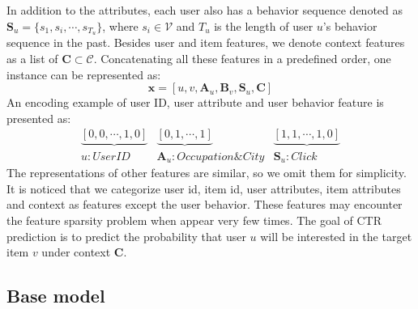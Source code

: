 In addition to the attributes, each user also has a behavior sequence denoted as $\textbf{S}_u = \{s_1,s_i,\cdots,s_{T_u}\}$, where $s_i \in \mathcal{V}$ and $T_u$ is the length of user $u$'s behavior sequence in the past.
Besides user and item features, we denote context features as a list of $\mathbf{C} \subset \mathcal{C}$.
Concatenating all these features in a predefined order, one instance can be represented as: 
\begin{equation}
\textbf{x}= [u, v, \textbf{A}_u, \textbf{B}_v, \textbf{S}_u, \textbf{C}]
\end{equation}
An encoding example of user ID, user attribute and user behavior feature is presented as:
$$
 \begin{matrix}
 \underbrace{ [0,0,\cdots,1,0] } &  \underbrace{ [0,1,\cdots,1] } &  \underbrace{ [1,1,\cdots,1,0] } \\
 u: User ID & \textbf{A}_u:Occupation \& City &  \textbf{S}_u: Click
\end{matrix}
$$
The representations of other features are similar, so we omit them for simplicity.
It is noticed that we categorize user id, item id, user attributes, item attributes and context as features except the user behavior.
These features may encounter the feature sparsity problem when appear very few times.  
The goal of CTR prediction is to predict the probability that user $u$ will be interested in the target item $v$ under context $\textbf{C}$.





\subsection{Base model}

